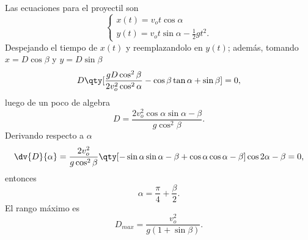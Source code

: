 \begin{mdframed}[style=warning]
	\begin{ejercicio}
		Las ecuaciones para el proyectil son
			$$ \left\{\begin{array}{c}
				x(t) = v_o t \cos{\alpha} \\
				y(t) = v_o t \sin{\alpha} - \frac{1}{2} gt^2 .
			\end{array}\right. $$
		Despejando el tiempo de $x(t)$ y reemplazandolo en $y(t)$; además, tomando $x = D\cos{\beta}$ y $y = D\sin{\beta}$
			$$ D\qty[\frac{gD\cos^2 {\beta}}{2v_o ^2 \cos^2 {\alpha}} - \cos{\beta}\tan{\alpha} + \sin{\beta}] = 0, $$
		luego de un poco de algebra
			$$ \boxed{D = \frac{2v_o ^2 \cos{\alpha} \sin{\alpha - \beta}}{g\cos^2 {\beta}}.} $$
		Derivando respecto a $\alpha$
			$$ \dv{D}{\alpha} = \frac{2v_o ^2}{g\cos^2 {\beta}} \qty[-\sin{\alpha} \sin{\alpha - \beta} + \cos{\alpha} \cos{\alpha - \beta}]\cos{2\alpha - \beta} = 0, $$
		entonces
			$$ \boxed{\alpha = \frac{\pi}{4} + \frac{\beta}{2}.} $$
		El rango máximo es
			$$ \boxed{D_{max} = \frac{v_o ^2}{g(1 + \sin{\beta})}.} $$
	\end{ejercicio}
\end{mdframed}
